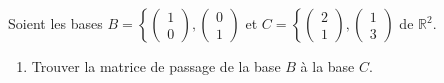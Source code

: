 \begin{exercice}
Soient les bases \( B = \left\{ \begin{pmatrix} 1 \\ 0 \end{pmatrix}, 
\begin{pmatrix} 0 \\ 1 \end{pmatrix} \right.\) et \( C = \left\{ 
  \begin{pmatrix} 2 \\ 1 \end{pmatrix}, \begin{pmatrix} 1 \\ 3 \end{pmatrix} 
\right. \) de \( \mathbb{R}^2 \).
\begin{enumerate}
    \item Trouver la matrice de passage de la base \( B \) à la base \( C \).
\end{enumerate}
\end{exercice}

